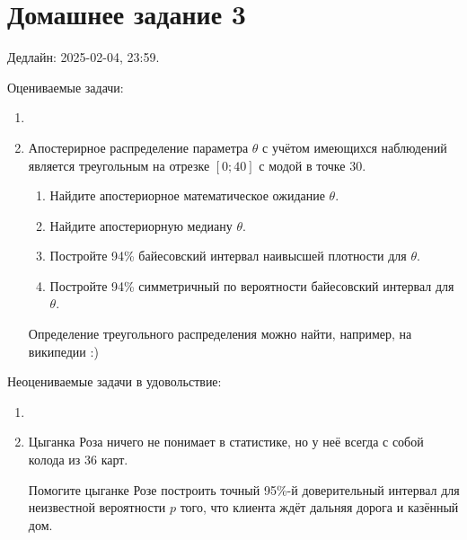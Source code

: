 \section*{Домашнее задание 3}

Дедлайн: 2025-02-04, 23:59.

Оцениваемые задачи:

\begin{enumerate}
\item 
    

\item Апостерирное распределение параметра $\theta$ с учётом имеющихся наблюдений является треугольным на отрезке $[0; 40]$ с модой в точке $30$. 
    \begin{enumerate}
        \item Найдите апостериорное математическое ожидание $\theta$.
        \item Найдите апостериорную медиану $\theta$.
        \item Постройте 94\% байесовский интервал наивысшей плотности для $\theta$.
        \item Постройте 94\% симметричный по вероятности байесовский интервал для $\theta$.
    \end{enumerate}

Определение треугольного распределения можно найти, например, на википедии :)

\end{enumerate}

Неоцениваемые задачи в удовольствие:

\begin{enumerate}
    \item 

    \item Цыганка Роза ничего не понимает в статистике, 
    но у неё всегда с собой колода из 36 карт.
    
    Помогите цыганке Розе построить точный 95\%-й доверительный интервал для
    неизвестной вероятности $p$ того, что клиента ждёт дальняя дорога и казённый дом.
    
\end{enumerate}

